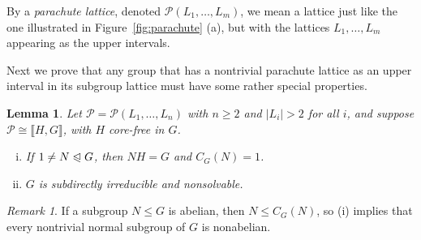 \documentclass{gen-j-l}
\newcommand{\lb}{\ensuremath{\llbracket}}
\newcommand{\rb}{\ensuremath{\rrbracket}}
\newcommand{\<}{\ensuremath{\langle}}
\renewcommand{\>}{\ensuremath{\rangle}}
\theoremstyle{plain}
\newtheorem{lemma}[theorem]{Lemma}
\theoremstyle{definition}
\theoremstyle{remark}
\newtheorem*{remark}{Remark}
\numberwithin{theorem}{section}
\numberwithin{claim}{section}
\numberwithin{equation}{section}
\numberwithin{conjecture}{section}
\renewcommand{\leq}{\ensuremath{\leqslant}}
\renewcommand{\geq}{\ensuremath{\geqslant}}
\newcommand{\subnormal}{\ensuremath{\trianglelefteqslant}}
\newcommand{\2}{\ensuremath{\mathbf{2}}}
\newcommand{\3}{\ensuremath{\mathbf{3}}}
\newcommand{\sP}{\ensuremath{\mathscr{P}}}
\begin{document}
By a \emph{parachute lattice}, denoted $\sP(L_1, \dots, L_m)$,
we mean a lattice just like the one illustrated in 
Figure~\ref{fig:parachute} (a), but with the lattices $L_1, \dots, L_m$
appearing as the upper intervals. %

Next we prove that %
any group that has a nontrivial parachute lattice as an upper interval
in its subgroup lattice must have some rather special properties.  
\begin{lemma}
\label{lemma-wjd-5}
 Let $\sP = \sP(L_1, \dots, L_n)$ with $n\geq 2$ and $|L_i|>2$ for all
$i$, and suppose $\sP \cong \lb H, G \rb$, with $H$ core-free in $G$.  
\begin{enumerate}[(i)]
\item If $1\neq N \subnormal G$, then $NH = G$ and $C_G(N)=1$.
\item $G$ is subdirectly irreducible and nonsolvable.
\end{enumerate}
\end{lemma}
\begin{remark}
If a subgroup $N\leq G$ is abelian, then $N \leq C_G(N)$, so (i) implies
that every nontrivial normal subgroup of $G$ is nonabelian.  
\end{remark}
\end{document}
